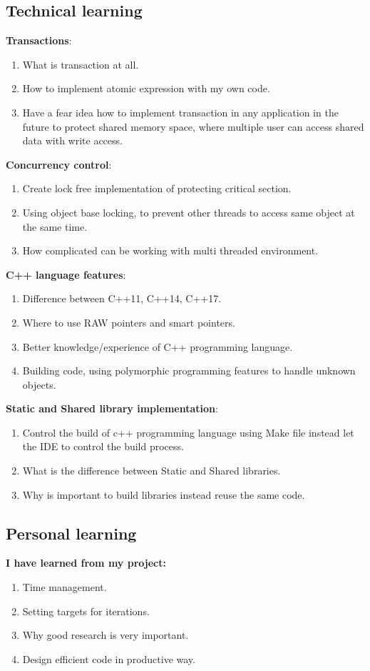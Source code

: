 \documentclass[12pt]{article}
\begin{document}
\subsection{Technical learning}
\textbf{Transactions}:
\begin{enumerate}
\item What is transaction at all. 
\item How to implement atomic expression with my own code.
\item Have a fear idea how to implement transaction in any application in the future to protect shared memory space, where multiple user can access shared data with write access.
\end{enumerate}
\textbf{Concurrency control}:
\begin{enumerate}
\item Create lock free implementation of protecting critical section. 
\item Using object base locking, to prevent other threads to access same object at the same time.
\item How complicated can be working with multi threaded environment.
\end{enumerate}
\textbf{C++ language features}:
\begin{enumerate}
\item Difference between C++11, C++14, C++17.
\item Where to use RAW pointers and smart pointers.
\item Better knowledge/experience of C++ programming language.
\item Building code, using polymorphic programming features to handle unknown objects.
\end{enumerate}
\textbf{Static and Shared library implementation}:
\begin{enumerate}
\item Control the build of c++ programming language using Make file instead let the IDE to control the build process.
\item What is the difference between Static and Shared libraries.
\item Why is important to build libraries instead reuse the same code.
\end{enumerate}
\subsection{Personal learning}
\textbf{I have learned from my project:}
\begin{enumerate}
\item Time management.
\item Setting targets for iterations.
\item Why good research is very important.
\item Design efficient code in productive way.
\end{enumerate}
\end{document}
